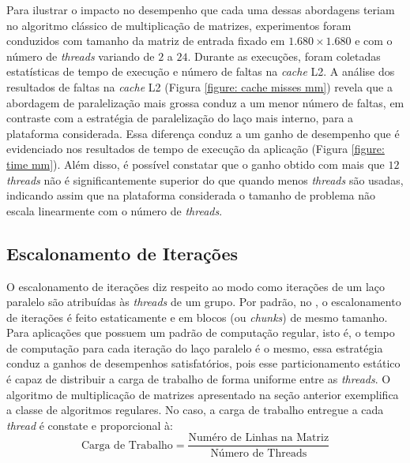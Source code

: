 \documentclass{SBCbookchapter}
\begin{document}
		Para ilustrar o impacto no desempenho que cada uma dessas
		abordagens teriam no algoritmo clássico de multiplicação de
		matrizes, experimentos foram conduzidos com tamanho da matriz de
		entrada fixado em $1.680 \times 1.680$ e com o número de
		\textit{threads} variando de $2$ a $24$. Durante as execuções,
		foram coletadas estatísticas de tempo de execução e número de
		faltas na \textit{cache} L2.  A análise dos resultados de faltas
		na \textit{cache} L2 (Figura \ref{figure: cache misses mm})
		revela que a abordagem de paralelização mais grossa conduz a um
		menor número de faltas, em contraste com a estratégia de
		paralelização do laço mais interno, para a plataforma
		considerada. Essa diferença conduz a um ganho de desempenho que
		é evidenciado nos resultados de tempo de execução da aplicação
		(Figura \ref{figure: time mm}). Além disso, é possível constatar
		que o ganho obtido com mais que $12$ \textit{threads} não é
		significantemente superior do que quando menos \textit{threads}
		são usadas, indicando assim que na plataforma considerada o
		tamanho de problema não escala linearmente com o número de
		\textit{threads}.

	\subsection{Escalonamento de Iterações}
	\label{subsection: escalonamento de iteracoes}

		O escalonamento de iterações diz respeito ao modo como iterações
		de um laço paralelo são atribuídas às \textit{threads} de um
		grupo. Por padrão, no \openmp, o escalonamento de iterações é
		feito estaticamente e em blocos (ou \textit{chunks}) de mesmo
		tamanho. Para aplicações que possuem um padrão de computação
		regular, isto é, o tempo de computação para cada iteração do
		laço paralelo é o mesmo, essa estratégia conduz a ganhos de
		desempenhos satisfatórios, pois esse particionamento estático é
		capaz de distribuir a carga de trabalho de forma uniforme entre
		as \textit{threads}. O algoritmo de multiplicação de matrizes
		apresentado na seção anterior exemplifica a classe de algoritmos
		regulares. No caso, a carga de trabalho entregue a cada
		\textit{thread} é constate e proporcional à:
		\begin{equation}
			\text{Carga de Trabalho} = \dfrac{\text{Numéro de Linhas na Matriz}}%
			                                 {\text{Número de Threads}}
		\end{equation}
\end{document}
